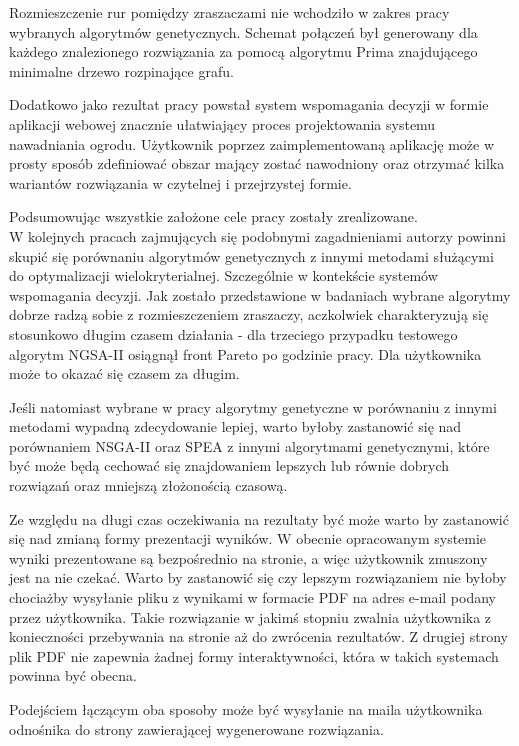 \documentclass[twoside]{iisthesis}
\begin{document}
Rozmieszczenie rur pomiędzy zraszaczami nie wchodziło w zakres pracy wybranych algorytmów genetycznych. Schemat połączeń był generowany dla każdego znalezionego rozwiązania za pomocą algorytmu Prima znajdującego minimalne drzewo rozpinające grafu.

Dodatkowo jako rezultat pracy powstał system wspomagania decyzji w formie aplikacji webowej znacznie ułatwiający proces projektowania systemu nawadniania ogrodu. Użytkownik poprzez zaimplementowaną aplikację może w prosty sposób zdefiniować obszar mający zostać nawodniony oraz otrzymać kilka wariantów rozwiązania w czytelnej i przejrzystej formie.

Podsumowując wszystkie założone cele pracy zostały zrealizowane.\\

W kolejnych pracach zajmujących się podobnymi zagadnieniami autorzy powinni skupić się porównaniu algorytmów genetycznych z innymi metodami służącymi do optymalizacji wielokryterialnej. Szczególnie w kontekście systemów wspomagania decyzji. Jak zostało przedstawione w badaniach wybrane algorytmy dobrze radzą sobie z rozmieszczeniem zraszaczy, aczkolwiek charakteryzują się stosunkowo długim czasem działania - dla trzeciego przypadku testowego algorytm NGSA-II osiągnął front Pareto po godzinie pracy. Dla użytkownika może to okazać się czasem za długim. 

Jeśli natomiast wybrane w pracy algorytmy genetyczne w porównaniu z innymi metodami wypadną zdecydowanie lepiej, warto byłoby zastanowić się nad porównaniem NSGA-II oraz SPEA z innymi algorytmami genetycznymi, które być może będą cechować się znajdowaniem lepszych lub równie dobrych rozwiązań oraz mniejszą złożonością czasową.

Ze względu na długi czas oczekiwania na rezultaty być może warto by zastanowić się nad zmianą formy prezentacji wyników. W obecnie opracowanym systemie wyniki prezentowane są bezpośrednio na stronie, a więc użytkownik zmuszony jest na nie czekać. Warto by zastanowić się czy lepszym rozwiązaniem nie byłoby chociażby wysyłanie pliku z wynikami w formacie PDF na adres e-mail podany przez użytkownika. Takie rozwiązanie w jakimś stopniu zwalnia użytkownika z konieczności przebywania na stronie aż do zwrócenia rezultatów. Z drugiej strony plik PDF nie zapewnia żadnej formy interaktywności, która w takich systemach powinna być obecna.

Podejściem łączącym oba sposoby może być wysyłanie na maila użytkownika odnośnika do strony zawierającej wygenerowane rozwiązania.
\end{document}
